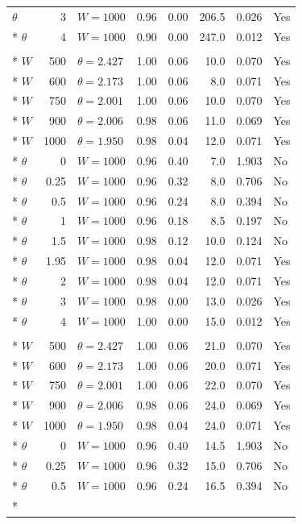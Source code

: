 \documentclass[preprint,12pt]{elsarticle}
\begin{document}
\begin{longtable}{lrlrrrrl}
$\theta$ & 3 & $W=1000$ & 0.96 & 0.00 & 206.5 & 0.026 & Yes\\*
$\theta$ & 4 & $W=1000$ & 0.90 & 0.00 & 247.0 & 0.012 & Yes\\
\addlinespace
\multicolumn{8}{l}{\textit{Global abrupt (GSG)}}\\*
$W$ & 500 & $\theta=2.427$ & 1.00 & 0.06 & 10.0 & 0.070 & Yes\\*
$W$ & 600 & $\theta=2.173$ & 1.00 & 0.06 & 8.0 & 0.071 & Yes\\*
$W$ & 750 & $\theta=2.001$ & 1.00 & 0.06 & 10.0 & 0.070 & Yes\\*
$W$ & 900 & $\theta=2.006$ & 0.98 & 0.06 & 11.0 & 0.069 & Yes\\*
$W$ & 1000 & $\theta=1.950$ & 0.98 & 0.04 & 12.0 & 0.071 & Yes\\*
$\theta$ & 0 & $W=1000$ & 0.96 & 0.40 & 7.0 & 1.903 & No\\*
$\theta$ & 0.25 & $W=1000$ & 0.96 & 0.32 & 8.0 & 0.706 & No\\*
$\theta$ & 0.5 & $W=1000$ & 0.96 & 0.24 & 8.0 & 0.394 & No\\*
$\theta$ & 1 & $W=1000$ & 0.96 & 0.18 & 8.5 & 0.197 & No\\*
$\theta$ & 1.5 & $W=1000$ & 0.98 & 0.12 & 10.0 & 0.124 & No\\*
$\theta$ & 1.95 & $W=1000$ & 0.98 & 0.04 & 12.0 & 0.071 & Yes\\*
$\theta$ & 2 & $W=1000$ & 0.98 & 0.04 & 12.0 & 0.071 & Yes\\*
$\theta$ & 3 & $W=1000$ & 0.98 & 0.00 & 13.0 & 0.026 & Yes\\*
$\theta$ & 4 & $W=1000$ & 1.00 & 0.00 & 15.0 & 0.012 & Yes\\
\addlinespace
\multicolumn{8}{l}{\textit{Transition 500}}\\*
$W$ & 500 & $\theta=2.427$ & 1.00 & 0.06 & 21.0 & 0.070 & Yes\\*
$W$ & 600 & $\theta=2.173$ & 1.00 & 0.06 & 20.0 & 0.071 & Yes\\*
$W$ & 750 & $\theta=2.001$ & 1.00 & 0.06 & 22.0 & 0.070 & Yes\\*
$W$ & 900 & $\theta=2.006$ & 0.98 & 0.06 & 24.0 & 0.069 & Yes\\*
$W$ & 1000 & $\theta=1.950$ & 0.98 & 0.04 & 24.0 & 0.071 & Yes\\*
$\theta$ & 0 & $W=1000$ & 0.96 & 0.40 & 14.5 & 1.903 & No\\*
$\theta$ & 0.25 & $W=1000$ & 0.96 & 0.32 & 15.0 & 0.706 & No\\*
$\theta$ & 0.5 & $W=1000$ & 0.96 & 0.24 & 16.5 & 0.394 & No\\*

\end{longtable}
\end{document}
